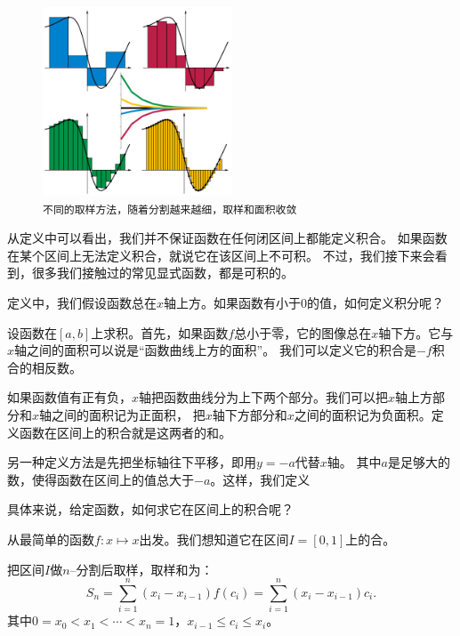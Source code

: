 \documentclass[12pt,UTF8]{ctexbook}
\begin{document}
\begin{figure}[h] %
    \vspace{4pt}
    \centering
    \includegraphics[width=0.5\textwidth]{积分定义6.png} %
    \caption*{\texttt{不同的取样方法，随着分割越来越细，取样和面积收敛}}
\end{figure}

从定义中可以看出，我们并不保证函数在任何闭区间上都能定义积合。
如果函数在某个区间上无法定义积合，就说它在该区间上不可积。
不过，我们接下来会看到，很多我们接触过的常见显式函数，都是可积的。

定义中，我们假设函数总在$x$轴上方。如果函数有小于$0$的值，如何定义积分呢？

设函数在$[a,b]$上求积。首先，如果函数$f$总小于零，它的图像总在$x$轴下方。它与$x$轴之间的面积可以说是“函数曲线上方的面积”。
我们可以定义它的积合是$-f$积合的相反数。

如果函数值有正有负，$x$轴把函数曲线分为上下两个部分。我们可以把$x$轴上方部分和$x$轴之间的面积记为正面积，
把$x$轴下方部分和$x$之间的面积记为负面积。定义函数在区间上的积合就是这两者的和。

另一种定义方法是先把坐标轴往下平移，即用$y = -a $代替$x$轴。
其中$a$是足够大的数，使得函数在区间上的值总大于$-a$。这样，我们定义

具体来说，给定函数，如何求它在区间上的积合呢？

从最简单的函数$f: x\mapsto x$出发。我们想知道它在区间$I = [0, 1]$上的合。

把区间$I$做$n$–分割后取样，取样和为：
$$ S_n = \sum_{i=1}^n (x_i - x_{i-1}) f(c_i) = \sum_{i=1}^n (x_i - x_{i-1}) c_i. $$
其中$0 = x_0 < x_1 < \cdots < x_n = 1$，$x_{i-1} \leqslant c_i \leqslant x_i$。
\end{document}
